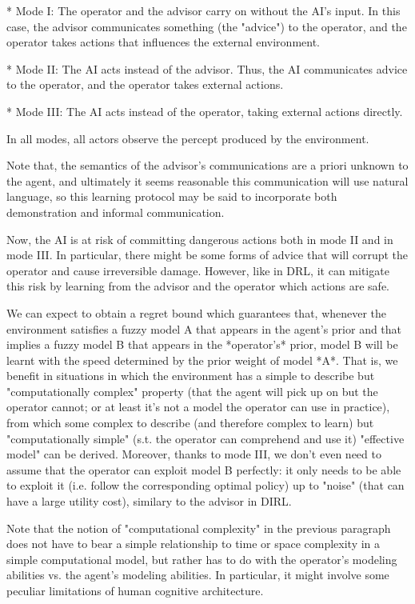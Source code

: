 \documentclass[a4paper]{article}
\begin{document}
* Mode I: The operator and the advisor carry on without the AI's input. In this case, the advisor communicates something (the "advice") to the operator, and the operator takes actions that influences the external environment.

* Mode II: The AI acts instead of the advisor. Thus, the AI communicates advice to the operator, and the operator takes external actions.

* Mode III: The AI acts instead of the operator, taking external actions directly.

In all modes, all actors observe the percept produced by the environment.

Note that, the semantics of the advisor's communications are a priori unknown to the agent, and ultimately it seems reasonable this communication will use natural language, so this learning protocol may be said to incorporate both demonstration and informal communication.

Now, the AI is at risk of committing dangerous actions both in mode II and in mode III. In particular, there might be some forms of advice that will corrupt the operator and cause irreversible damage. However, like in DRL, it can mitigate this risk by learning from the advisor and the operator which actions are safe.

We can expect to obtain a regret bound which guarantees that, whenever the environment satisfies a fuzzy model A that appears in the agent's prior and that implies a fuzzy model B that appears in the *operator's* prior, model B will be learnt with the speed determined by the prior weight of model *A*. That is, we benefit in situations in which the environment has a simple to describe but "computationally complex" property (that the agent will pick up on but the operator cannot; or at least it's not a model the operator can use in practice), from which some complex to describe (and therefore complex to learn) but "computationally simple" (s.t. the operator can comprehend and use it) "effective model" can be derived. Moreover, thanks to mode III, we don't even need to assume that the operator can exploit model B perfectly: it only needs to be able to exploit it (i.e. follow the corresponding optimal policy) up to "noise" (that can have a large utility cost), similary to the advisor in DIRL.

Note that the notion of "computational complexity" in the previous paragraph does not have to bear a simple relationship to time or space complexity in a simple computational model, but rather has to do with the operator's modeling abilities vs. the agent's modeling abilities. In particular, it might involve some peculiar limitations of human cognitive architecture.
\end{document}
